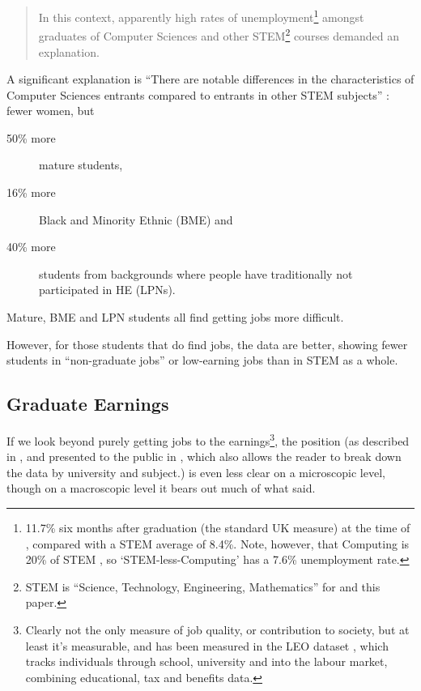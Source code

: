 \documentclass[sigconf,anonymous]{acmart}
\begin{document}
\begin{quote} In this context, apparently high rates of
unemployment\footnote{11.7\% six months after graduation (the standard
UK measure) at the time of \cite{Shadbolt2016a}, compared with a STEM
average of 8.4\%. Note, however, that Computing is 20\% of STEM
\cite[Table 1]{Wakeham2016a}, so `STEM-less-Computing' has a 7.6\%
unemployment rate.} amongst graduates of Computer Sciences and other
STEM\footnote{STEM is ``Science, Technology, Engineering,
Mathematics'' for \cite{Shadbolt2016a} and this paper.} courses
demanded an explanation.
\end{quote}

A significant explanation is ``There are notable differences in the
characteristics of Computer Sciences entrants compared to entrants in
other STEM subjects'' \cite[\P2.6]{Shadbolt2016a}: fewer women, but

\begin{description}
\item[50\% more] mature students,
\item[16\% more]Black and Minority Ethnic (BME) and
\item[40\% more]students from backgrounds where people have
traditionally not participated in HE (LPNs).
\end{description}

Mature, BME and LPN students all find getting jobs more difficult.
\par However, for those students that do find jobs, the data are
better, showing \cite[Figure 6]{Shadbolt2016a} fewer students in
``non-graduate jobs'' or low-earning jobs than in STEM as a whole.

\subsection{Graduate Earnings}
If we look beyond purely getting jobs to the earnings\footnote{Clearly
not the only measure of job quality, or contribution to society, but
at least it's measurable, and has been measured in the LEO dataset
\cite{DfE2017a}, which tracks individuals through school, university
and into the labour market, combining educational, tax and benefits
data.}, the position (as described in \cite{DfE2018d}, and presented
to the public in \cite{BBC2018f}, which also allows the reader to
break down the data by university and subject.) is even less clear on
a microscopic level, though on a macroscopic level it bears out much
of what \cite{Shadbolt2016a} said.
\end{document}
